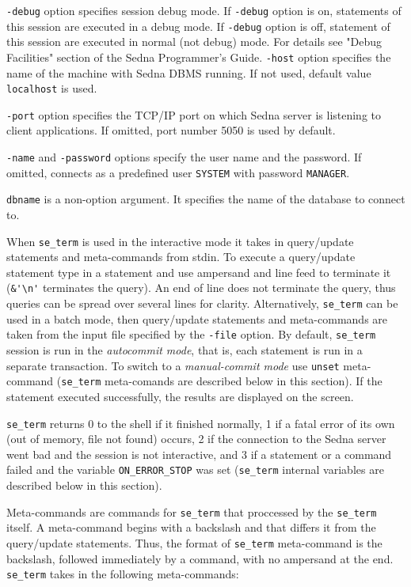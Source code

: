 \documentclass[a4paper,12pt]{article}
\begin{document}
\verb!-debug! option specifies session debug mode. If \verb!-debug! option is on, statements of this session are executed in a debug mode. If \verb!-debug! option is off, statement of this session are executed in normal (not debug) mode. For details see "Debug Facilities" section of the Sedna Programmer's Guide.
\verb!-host! option specifies the name of the machine with Sedna DBMS running. If not used, default value \verb!localhost! is used.

\verb!-port! option specifies the TCP/IP port on which Sedna server is listening to client applications. If omitted, port number 5050 is used by default.

\verb!-name! and \verb!-password! options specify the user name and the password. If omitted, connects as a predefined user \verb!SYSTEM! with password \verb!MANAGER!.

\verb!dbname! is a non-option argument. It specifies the name of the database to connect to.

When \verb!se_term! is used in the interactive mode it takes in query/update statements and meta-commands from stdin. To execute a query/update statement type in a statement and use ampersand and line feed to terminate it (\verb!&'\n'! terminates the query). An end of line does not terminate the query, thus queries can be spread over several lines for clarity. Alternatively, \verb!se_term! can be used in a batch mode, then query/update statements and meta-commands are taken from the input file specified by the \verb!-file! option. By default, \verb!se_term! session is run in the \emph{autocommit mode}, that is, each statement is run in a separate transaction. To switch to a \emph{manual-commit mode} use \verb!unset! meta-command (\verb!se_term! meta-comands are described below in this section). If the statement executed successfully, the results are displayed on the screen.

\verb!se_term! returns 0 to the shell if it finished normally, 1 if a fatal error of its own (out of memory, file not
found) occurs, 2 if the connection to the Sedna server went bad and the session is not interactive, and 3 if
a statement or a command failed and the variable \verb!ON_ERROR_STOP! was set (\verb!se_term! internal variables are described below in this section).

Meta-commands are commands for \verb!se_term! that proccessed by the \verb!se_term! itself. A meta-command begins with a backslash and that differs it from the query/update statements. Thus, the format of \verb!se_term! meta-command is the backslash, followed immediately by a command, with no ampersand at the end. \verb!se_term! takes in the following meta-commands:
\end{document}

